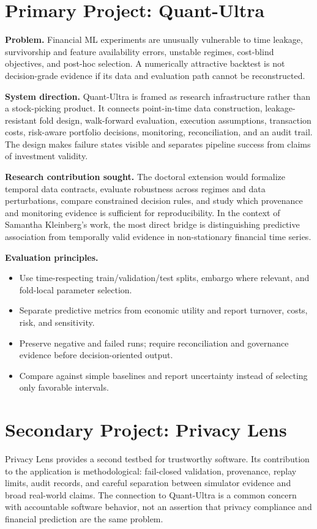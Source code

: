 \documentclass[11pt]{article}
\begin{document}
\section*{Primary Project: Quant-Ultra}
\textbf{Problem.} Financial ML experiments are unusually vulnerable to time leakage, survivorship and feature availability errors, unstable regimes, cost-blind objectives, and post-hoc selection. A numerically attractive backtest is not decision-grade evidence if its data and evaluation path cannot be reconstructed.

\textbf{System direction.} Quant-Ultra is framed as research infrastructure rather than a stock-picking product. It connects point-in-time data construction, leakage-resistant fold design, walk-forward evaluation, execution assumptions, transaction costs, risk-aware portfolio decisions, monitoring, reconciliation, and an audit trail. The design makes failure states visible and separates pipeline success from claims of investment validity.

\textbf{Research contribution sought.} The doctoral extension would formalize temporal data contracts, evaluate robustness across regimes and data perturbations, compare constrained decision rules, and study which provenance and monitoring evidence is sufficient for reproducibility. In the context of Samantha Kleinberg's work, the most direct bridge is distinguishing predictive association from temporally valid evidence in non-stationary financial time series.

\textbf{Evaluation principles.}
\begin{itemize}
\item Use time-respecting train/validation/test splits, embargo where relevant, and fold-local parameter selection.
\item Separate predictive metrics from economic utility and report turnover, costs, risk, and sensitivity.
\item Preserve negative and failed runs; require reconciliation and governance evidence before decision-oriented output.
\item Compare against simple baselines and report uncertainty instead of selecting only favorable intervals.
\end{itemize}

\section*{Secondary Project: Privacy Lens}
Privacy Lens provides a second testbed for trustworthy software. Its contribution to the application is methodological: fail-closed validation, provenance, replay limits, audit records, and careful separation between simulator evidence and broad real-world claims. The connection to Quant-Ultra is a common concern with accountable software behavior, not an assertion that privacy compliance and financial prediction are the same problem.
\end{document}
